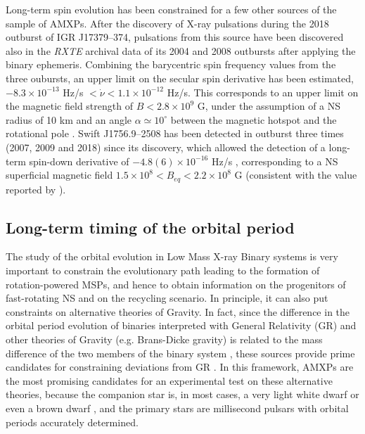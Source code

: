 \documentclass[graybox]{svmult}
\def \rxte {{\em RXTE\xspace}}
\begin{document}
Long-term spin evolution has been constrained for a few other sources of the sample of AMXPs. After the discovery of X-ray pulsations during the 2018 outburst of IGR J17379--374, pulsations from this source have been discovered also in the \rxte{} archival data of its 2004 and 2008 outbursts after applying the binary ephemeris. Combining the barycentric spin frequency values from the three oubursts, an upper limit on the secular spin derivative has been estimated, $-8.3\times10^{-13}$ Hz/s $<\dot{\nu}<1.1\times 10^{-12}$ Hz/s. This corresponds to an upper limit on the magnetic field strength of $B<2.8\times 10^9$ G, under the assumption of a NS radius of 10 km and an angle $\alpha\simeq 10^\circ$ between the magnetic hotspot and the rotational pole \cite{Sanna2018b}. Swift J1756.9--2508 has been detected in outburst three times (2007, 2009 and 2018) since its discovery, which allowed the detection of a long-term spin-down derivative of $-4.8(6)\times 10^{-16}$ Hz/s \cite{Sanna2019}, corresponding to a NS superficial magnetic field $1.5\times 10^8 < B_{eq} < 2.2\times 10^8$ G (consistent with the value reported by \cite{Mukherjee2015}).
 

\subsection{Long-term timing of the orbital period}
The study of the orbital evolution in Low Mass X-ray Binary systems is very important to constrain the evolutionary path leading to the formation of rotation-powered MSPs, and hence to obtain information on the progenitors of fast-rotating NS and on the recycling scenario. In principle, it can also put constraints on alternative theories of Gravity. In fact, since the difference in the orbital period evolution of binaries interpreted with General Relativity (GR) and other theories of Gravity (e.g. Brans-Dicke gravity) is related to the mass difference of the two members of the binary system \cite{Will2006}, these sources provide prime candidates for constraining deviations from GR \cite{Psaltis2008}. In this framework, AMXPs are the most promising candidates for an experimental test on these alternative theories, because the companion star is, in most cases, a very light white dwarf or even a brown dwarf \cite{Bildsten2001}, and the primary stars are millisecond pulsars with orbital periods accurately determined. 
 
\end{document}
